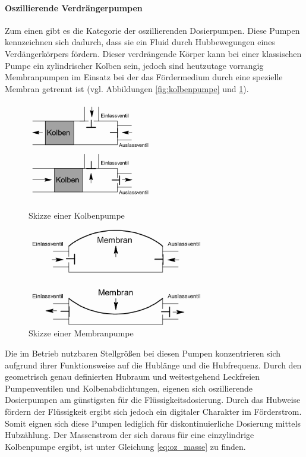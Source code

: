 \paragraph{Oszillierende Verdrängerpumpen} Zum einen gibt es die Kategorie der oszillierenden Dosierpumpen. Diese Pumpen kennzeichnen sich dadurch, dass sie ein Fluid durch Hubbewegungen eines Verdängerkörpers fördern. Dieser verdrängende Körper kann bei einer klassischen Pumpe ein zylindrischer Kolben sein, jedoch sind heutzutage vorrangig Membranpumpen im Einsatz bei der das Fördermedium durch eine spezielle Membran getrennt ist (vgl. Abbildungen \ref{fig:kolbenpumpe} und \ref{fig:membranpumpe}). 

\begin{figure}[h!]
	\begin{minipage}[b]{0.475\textwidth}
		\centering
		\includegraphics[height=4.25cm]{img/kolbenpumpe}
		\caption{Skizze einer Kolbenpumpe}
		\label{fig:kolbenpumpe}
	\end{minipage}
	\begin{minipage}[b]{0.475\textwidth}
		\centering
		\includegraphics[height=4.25cm]{img/membranpumpe}
		\caption{Skizze einer Membranpumpe}
		\label{fig:membranpumpe}
	\end{minipage}
\end{figure}
\FloatBarrier

Die im Betrieb nutzbaren Stellgrößen bei diesen Pumpen konzentrieren sich aufgrund ihrer Funktionsweise auf die Hublänge und die Hubfrequenz. Durch den geometrisch genau definierten Hubraum und weitestgehend Leckfreien Pumpenventilen und Kolbenabdichtungen, eigenen sich oszillierende Dosierpumpen am günstigsten für die Flüssigkeitsdosierung. Durch das Hubweise fördern der Flüssigkeit ergibt sich jedoch ein digitaler Charakter im Förderstrom. Somit eignen sich diese Pumpen lediglich für diskontinuierliche Dosierung mittels Hubzählung. Der Massenstrom der sich daraus für eine einzylindrige Kolbenpumpe ergibt, ist unter Gleichung \eqref{eq:oz_masse} zu finden. \cite{Vetter.2002}

